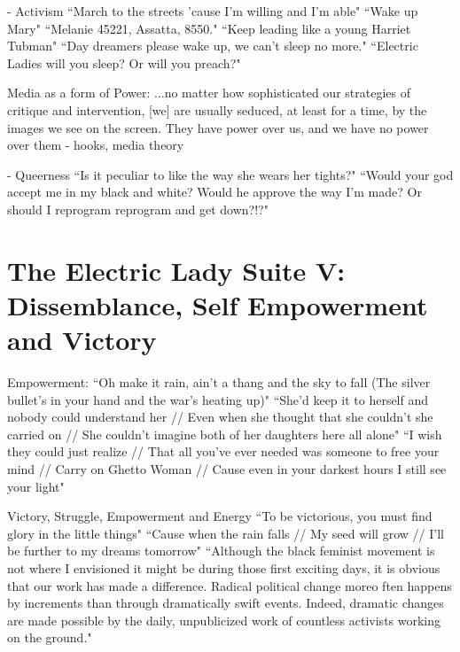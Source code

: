 \documentclass[a4paper, 11pt]{article} %
\begin{document}
- Activism
``March to the streets 'cause I'm willing and I'm able" \cite{queen}
``Wake up Mary" \cite{sallyride}
``Melanie 45221, Assatta, 8550." \cite{chromeshoppe}
``Keep leading like a young Harriet Tubman" \cite{queen}
``Day dreamers please wake up, we can't sleep no more." \cite{sincerelyjane}
``Electric Ladies will you sleep? Or will you preach?" \cite{queen}

Media as a form of Power:
...no matter how sophisticated our strategies of critique and intervention, [we] are usually seduced, at least for a time, by the images we see on the screen. They have power over us, and we have no power over them - hooks, media theory

- Queerness
``Is it peculiar to like the way she wears her tights?" \cite{queen}
``Would your god accept me in my black and white? Would he approve the way I'm made? Or should I reprogram reprogram and get down?!?" \cite{queen}


\section*{The Electric Lady Suite V: Dissemblance, Self Empowerment and Victory}

Empowerment: 
``Oh make it rain, ain't a thang and the sky to fall (The silver bullet's in your hand and the war's heating up)" \cite{manymoons}
``She'd keep it to herself and nobody could understand her // Even when she thought that she couldn't she carried on // She couldn't imagine both of her daughters here all alone" \cite{ghettowoman}
``I wish they could just realize // That all you've ever needed was someone to free your mind // Carry on Ghetto Woman // Cause even in your darkest hours I still see your light" \cite{ghettowoman}

Victory, Struggle, Empowerment and Energy
``To be victorious, you must find glory in the little things" \cite{victory}
``Cause when the rain falls // My seed will grow // I'll be further to my dreams tomorrow" \cite{victory}
``Although the black feminist movement is not where I envisioned it might be during those first exciting days, it is obvious that our work has made a difference. Radical political change moreo ften happens by increments than through dramatically swift events. Indeed, dramatic changes are made possible by the daily, unpublicized work of countless activists working on the ground." \cite{smithhomegirls}
\end{document}
